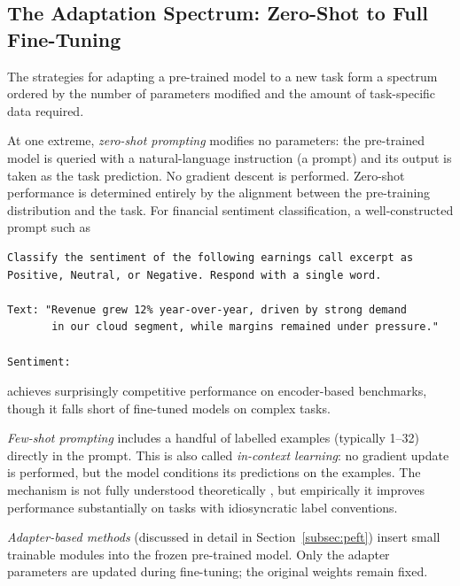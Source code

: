\begin{deepdive}

\subsection{The Adaptation Spectrum: Zero-Shot to Full Fine-Tuning}
\label{subsec:adaptation-spectrum}

The strategies for adapting a pre-trained model to a new task form a spectrum
ordered by the number of parameters modified and the amount of task-specific
data required.

At one extreme, \emph{zero-shot prompting} modifies no parameters: the
pre-trained model is queried with a natural-language instruction (a prompt)
and its output is taken as the task prediction.  No gradient descent is
performed.  Zero-shot performance is determined entirely by the alignment
between the pre-training distribution and the task.  For financial sentiment
classification, a well-constructed prompt such as

\begin{listing}[H]
\begin{verbatim}
Classify the sentiment of the following earnings call excerpt as
Positive, Neutral, or Negative. Respond with a single word.

Text: "Revenue grew 12% year-over-year, driven by strong demand
       in our cloud segment, while margins remained under pressure."

Sentiment:
\end{verbatim}
\caption{Zero-shot sentiment prompt for earnings text.}
\label{lst:zero-shot-prompt}
\end{listing}

\noindent achieves surprisingly competitive performance on encoder-based
benchmarks, though it falls short of fine-tuned models on complex tasks.

\emph{Few-shot prompting} includes a handful of labelled examples (typically
1--32) directly in the prompt.  This is also called \emph{in-context learning}:
no gradient update is performed, but the model conditions its predictions on
the examples.  The mechanism is not fully understood theoretically
\citep{xie2022explanation,akyurek2022learning}, but
empirically it improves performance substantially on tasks with idiosyncratic
label conventions.

\emph{Adapter-based methods} (discussed in detail in
Section~\ref{subsec:peft}) insert small trainable modules into the frozen
pre-trained model.  Only the adapter parameters are updated during fine-tuning;
the original weights remain fixed.


\end{deepdive}

